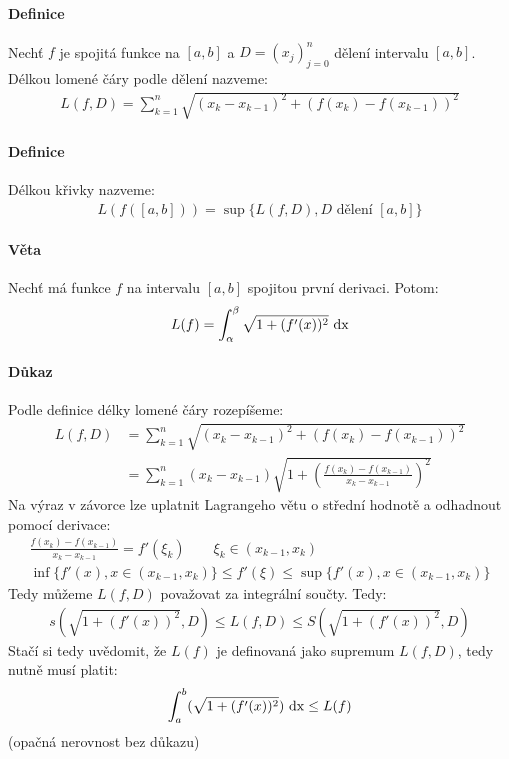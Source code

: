 \documentclass[a4paper,10pt]{article}
\begin{document}
\paragraph{Definice}
Nechť $f$ je spojitá funkce na $[a,b]$ a $D=(x_j)_{j=0}^n$ dělení intervalu
$[a,b]$. Délkou lomené čáry podle dělení nazveme:
\begin{align*}
	L(f,D) = \sum_{k=1}^n \sqrt{(x_k - x_{k-1})^2 + (f(x_k) - f(x_{k-1}))^2}
\end{align*}
\paragraph{Definice}
Délkou křivky nazveme:
\begin{align*}
	L(f([a,b])) = \sup \{ L(f,D), D \text{ dělení } [a,b]\}
\end{align*}
\paragraph{Věta}
\setcounter{equation}{0}
Nechť má funkce $f$ na intervalu $[a,b]$ spojitou první derivaci. Potom:
\begin{align*}
	L(f) = \int_\alpha^\beta \sqrt{1+(f'(x))^2} \operatorname*{\,dx}
\end{align*}
\paragraph{Důkaz}
Podle definice délky lomené čáry rozepíšeme:
\begin{align}
	L(f,D) &= \sum_{k=1}^n \sqrt{(x_k - x_{k-1})^2 + (f(x_k) - f(x_{k-1}))^2}\\
		&= \sum_{k=1}^n (x_k - x_{k-1}) \sqrt{ 1 + 
				\left( \frac{f(x_k) - f(x_{k-1})}{x_k - x_{k-1}} \right)^2
			}
\end{align}
Na výraz v závorce lze uplatnit Lagrangeho větu o střední
hodnotě a odhadnout pomocí derivace:
\begin{align}
	\frac{f(x_k) - f(x_{k-1})}{x_k - x_{k-1}} = f'(\xi_k) \qquad \xi_k \in
	(x_{k-1}, x_k) \\
	\inf\{f'(x), x \in (x_{k-1}, x_k)\}
	\le f'(\xi)
	\le \sup \{f'(x), x \in (x_{k-1}, x_k)\}
\end{align}
Tedy můžeme $L(f,D)$ považovat za integrální součty. Tedy:
\begin{align}
	s(\sqrt{1+(f'(x))^2}, D) \le L(f,D) \le S(\sqrt{1+(f'(x))^2}, D)
\end{align}
Stačí si tedy uvědomit, že $L(f)$ je definovaná jako supremum $L(f,D)$, tedy nutně musí
platit:
\begin{align}
	\int_a^b( \sqrt{1+(f'(x))^2} ) \operatorname*{\,dx} \le L(f)
\end{align}
(opačná nerovnost bez důkazu)
\end{document}
